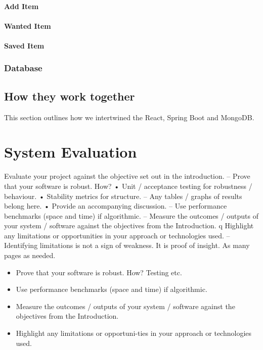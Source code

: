 \subsubsection{Add Item}

\subsubsection{Wanted Item}

\subsubsection{Saved Item}

\subsection{Database}

\section{How they work together}
This section outlines how we intertwined the React, Spring Boot and MongoDB.



\chapter{System Evaluation}
Evaluate your project against the objective set out in the
introduction.
– Prove that your software is robust. How?
• Unit / acceptance testing for robustness / behaviour.
• Stability metrics for structure.
– Any tables / graphs of results belong here.
• Provide an accompanying discussion.
– Use performance benchmarks (space and time) if algorithmic.
– Measure the outcomes / outputs of your system / software against
the objectives from the Introduction.
q Highlight any limitations or opportunities in your approach or
technologies used.
– Identifying limitations is not a sign of weakness. It is proof of
insight.
As many pages as needed.
\begin{itemize}
\item Prove that your software is robust. How? Testing etc. 
\item Use performance benchmarks (space and time) if algorithmic.
\item Measure the outcomes / outputs of your system / software against the objectives from the Introduction.
\item Highlight any limitations or opportuni-ties in your approach or technologies used.
\end{itemize}

